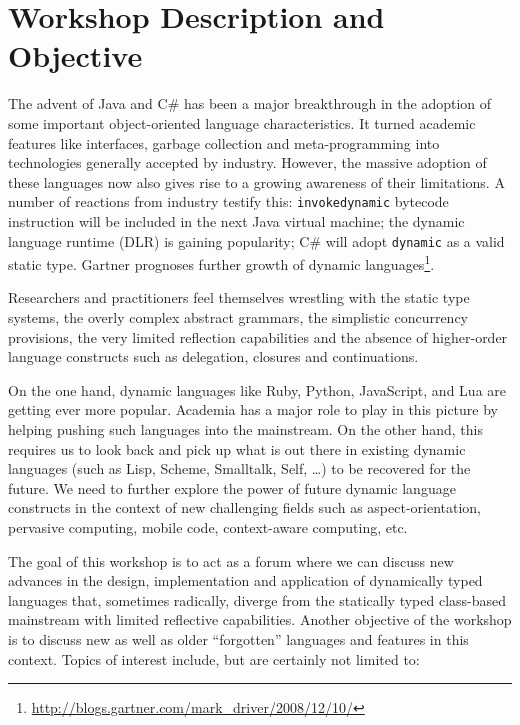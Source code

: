 \documentclass[runningheads]{llncs}
\begin{document}

\section{Workshop Description and Objective}

The advent of Java and C\# has been a major breakthrough in the adoption of some important object-oriented language characteristics. It turned academic features like interfaces, garbage collection and meta-programming into technologies generally accepted by industry. However, the massive adoption of these languages now also gives rise to a growing awareness of their limitations. 
A number of reactions from industry testify this: {\tt invokedynamic} bytecode instruction will be included in the next Java virtual machine; the dynamic language runtime (DLR) is gaining popularity; C\# will adopt  {\tt dynamic} as a valid static type. 
Gartner prognoses further growth of dynamic languages\footnote{\url{http://blogs.gartner.com/mark_driver/2008/12/10/}}.

Researchers and practitioners feel themselves wrestling with the static type systems, the overly complex abstract grammars, the simplistic concurrency provisions, the very limited reflection capabilities and the absence of higher-order language constructs such as delegation, closures and continuations.

On the one hand, dynamic languages like Ruby, Python, JavaScript, and Lua are getting ever more popular. Academia has a major role to play in this picture by helping pushing such languages into the mainstream. On the other hand, this requires us to look back and pick up what is out there in existing dynamic languages (such as Lisp, Scheme, Smalltalk, Self, \dots) to be recovered for the future. We need to further explore the power of future dynamic language constructs in the context of new challenging fields such as aspect-orientation, pervasive computing, mobile code, context-aware computing, etc. 

The goal of this workshop is to act as a forum where we can discuss new advances in the design, implementation and application of dynamically typed languages that, sometimes radically, diverge from the  statically typed class-based mainstream with limited reflective capabilities. Another objective of the workshop is to discuss new as well as older ``forgotten'' languages and features in this context. Topics of interest include, but are certainly not limited to: 
\end{document}
